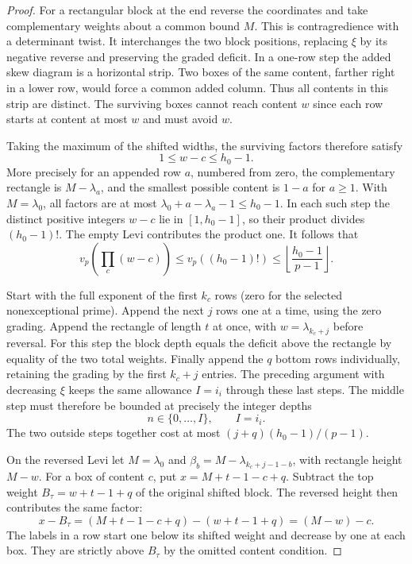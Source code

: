 \begin{proof}
For a rectangular block at the end reverse the coordinates
and take complementary weights about a common bound \(M\).
This is contragredience with a determinant twist. It
interchanges the two block positions, replacing \(\xi\) by
its negative reverse and preserving the graded deficit.
In a one-row step the added skew diagram is a horizontal
strip. Two boxes of the same content, farther right in a
lower row, would force a common added column. Thus all
contents in this strip are distinct. The surviving boxes cannot reach content \(w\)
since each row starts at content at most \(w\) and must
avoid \(w\).

Taking the maximum of the shifted widths, the surviving factors therefore satisfy
\[
 1\le w-c\le h_0-1.
\] More precisely
for an appended row \(a\), numbered from zero, the
complementary rectangle is \(M-\lambda_a\), and the
smallest possible content is \(1-a\) for \(a\ge1\).
With \(M=\lambda_0\), all factors are at most
\(\lambda_0+a-\lambda_a-1\le h_0-1\).
In each such step the distinct positive integers \(w-c\)
lie in \([1,h_0-1]\), so their product divides \((h_0-1)!\).
The empty Levi contributes the product one. It follows that
\[
  v_p\!\left(\prod_c(w-c)\right)
  \le v_p((h_0-1)!)
  \le\left\lfloor\frac{h_0-1}{p-1}\right\rfloor .
\]
\label{cor:lift-pieri-cost-5}

Start with the full exponent of the first \(k_c\) rows
(zero for the selected nonexceptional prime). Append the next
\(j\) rows one at a time, using the zero grading. Append
the rectangle of length \(t\) at once, with
\(w=\lambda_{k_c+j}\) before reversal. For this step the
block depth equals the deficit above the rectangle by
equality of the two total weights. Finally append the \(q\)
bottom rows individually, retaining the grading by the
first \(k_c+j\) entries. The preceding argument with
decreasing \(\xi\) keeps the same allowance \(I=i_i\)
through these last steps. The middle step must therefore be bounded at precisely the integer depths
\[
 n\in\{0,\ldots,I\},\qquad I=i_i .
\] The two outside
steps together cost at most \((j+q)(h_0-1)/(p-1)\).

On the reversed Levi let \(M=\lambda_0\) and
\(\beta_b=M-\lambda_{k_c+j-1-b}\), with rectangle height
\(M-w\). For a box of content \(c\), put
\(x=M+t-1-c+q\). Subtract the top weight \(B_\tau=w+t-1+q\) of the original shifted block. The reversed height then contributes the same factor:
\[
 x-B_\tau=(M+t-1-c+q)-(w+t-1+q)=(M-w)-c .
\] The labels in a row start
one below its shifted weight and decrease by one at each
box. They are strictly above \(B_\tau\) by the omitted
content condition.


\end{proof}

